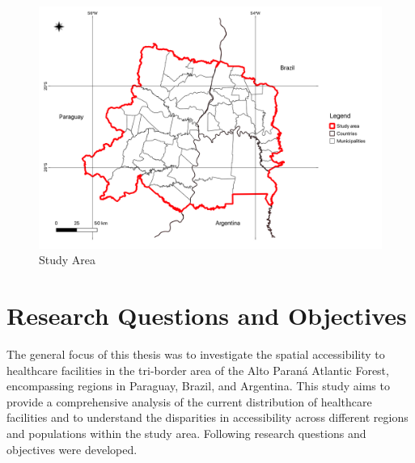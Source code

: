 \documentclass[11pt, a4paper]{report}
\begin{document}
\begin{figure}[H]
  \centering
  \includegraphics[width=0.9\linewidth]{figures/Study Area.png}
  \caption{Study Area}
  \label{fig:studyarea}
\end{figure}

\newpage
\section{Research Questions and Objectives}
The general focus of this thesis was to investigate the spatial accessibility to healthcare facilities in the tri-border area of the Alto Paraná Atlantic Forest, encompassing regions in Paraguay, Brazil, and Argentina. This study aims to provide a comprehensive analysis of the current distribution of healthcare facilities and to understand the disparities in accessibility across different regions and populations within the study area. Following research questions and objectives were developed.
\end{document}
